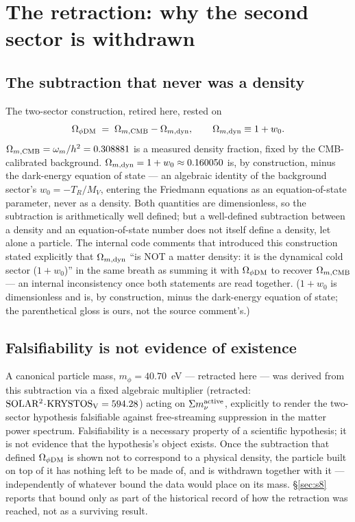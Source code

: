 \documentclass[12pt,a4paper]{article}
\begin{document}
\section{The retraction: why the second sector is withdrawn}
\label{sec:retraction}

\subsection{The subtraction that never was a density}

The two-sector construction, retired here, rested on
\begin{equation}
  \Omega_{\phi\rm DM} \;=\; \Omega_{m,\rm CMB} - \Omega_{m,\rm dyn},
  \qquad \Omega_{m,\rm dyn}\equiv 1+w_0.
\end{equation}
$\Omega_{m,\rm CMB}=\omega_m/h^2=0.308881$ is a measured density fraction, fixed
by the CMB-calibrated background. $\Omega_{m,\rm dyn}=1+w_0\approx0.160050$ is,
by construction, minus the dark-energy equation of state --- an algebraic
identity of the background sector's $w_0=-T_R/M_V$, entering the Friedmann
equations as an equation-of-state parameter, never as a density. Both
quantities are dimensionless, so the subtraction is arithmetically well
defined; but a well-defined subtraction between a density and an
equation-of-state number does not itself define a density, let alone a
particle. The internal code comments that introduced this construction stated
explicitly that $\Omega_{m,\rm dyn}$ ``is NOT a matter density: it is the
dynamical cold sector ($1+w_0$)'' in the same breath as summing it
with $\Omega_{\phi\rm DM}$ to recover $\Omega_{m,\rm CMB}$ --- an internal
inconsistency once both statements are read together. ($1+w_0$ is
dimensionless and is, by construction, minus the dark-energy equation of
state; the parenthetical gloss is ours, not the source comment's.)

\subsection{Falsifiability is not evidence of existence}

A canonical particle mass, $m_\phi=40.70$~eV --- retracted here --- was
derived from this subtraction via a fixed algebraic multiplier
(retracted: $\rm SOLAR^2\!\cdot\!KRYSTOS_V=594.28$) acting on $\Sigma m_\nu^{\rm active}$,
explicitly to render the two-sector hypothesis falsifiable against
free-streaming suppression in the matter power spectrum. Falsifiability is a
necessary property of a scientific hypothesis; it is not evidence that the
hypothesis's object exists. Once the subtraction that defined
$\Omega_{\phi\rm DM}$ is shown not to correspond to a physical density, the
particle built on top of it has nothing left to be made of, and is withdrawn
together with it --- independently of whatever bound the data would place on
its mass. \S\ref{sec:s8} reports that bound only as part of the historical
record of how the retraction was reached, not as a surviving result.
\end{document}
